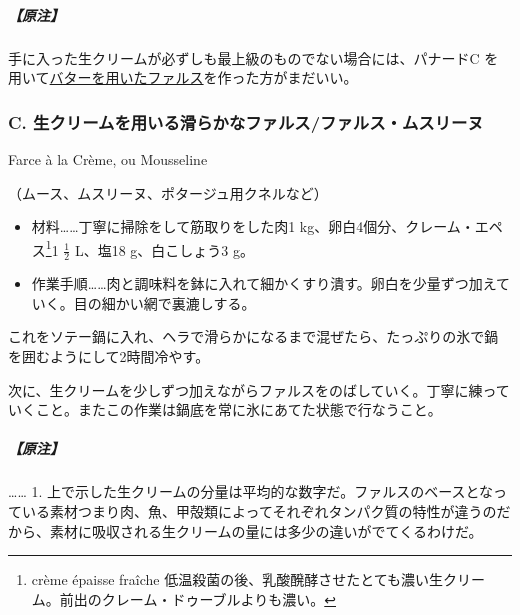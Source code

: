 \begin{recette}
\hypertarget{nota-farce-b}{%
\subparagraph{【原注】}\label{nota-farce-b}}

手に入った生クリームが必ずしも最上級のものでない場合には、パナードC
を用いて\protect\hyperlink{farce-a}{バターを用いたファルス}を作った方がまだいい。

\atoaki{}

\hypertarget{farce-c}{%
\subsubsection{C.
生クリームを用いる滑らかなファルス/ファルス・ムスリーヌ}\label{farce-c}}

\begin{frsubenv}

Farce à la Crème, ou Mousseline

\end{frsubenv}


（ムース、ムスリーヌ、ポタージュ用クネルなど）

\begin{itemize}
\item
  材料\ldots{}\ldots{}丁寧に掃除をして筋取りをした肉1
  kg、卵白4個分、クレーム・エペス\footnote{crème épaisse fraîche
    低温殺菌の後、乳酸醗酵させたとても濃い生クリーム。前出のクレーム・ドゥーブルよりも濃い。}1
  \(\frac{1}{2}\) L、塩18 g、白こしょう3 g。
\item
  作業手順\ldots{}\ldots{}肉と調味料を鉢に入れて細かくすり潰す。卵白を少量ずつ加えていく。目の細かい網で裏漉しする。
\end{itemize}

これをソテー鍋に入れ、ヘラで滑らかになるまで混ぜたら、たっぷりの氷で鍋を囲むようにして2時間冷やす。

次に、生クリームを少しずつ加えながらファルスをのばしていく。丁寧に練っていくこと。またこの作業は鍋底を常に氷にあてた状態で行なうこと。

\hypertarget{nota-farce-c}{%
\subparagraph{【原注】}\label{nota-farce-c}}

\ldots{}\ldots{} 1.
上で示した生クリームの分量は平均的な数字だ。ファルスのベースとなっている素材つまり肉、魚、甲殻類によってそれぞれタンパク質の特性が違うのだから、素材に吸収される生クリームの量には多少の違いがでてくるわけだ。


\end{recette}
